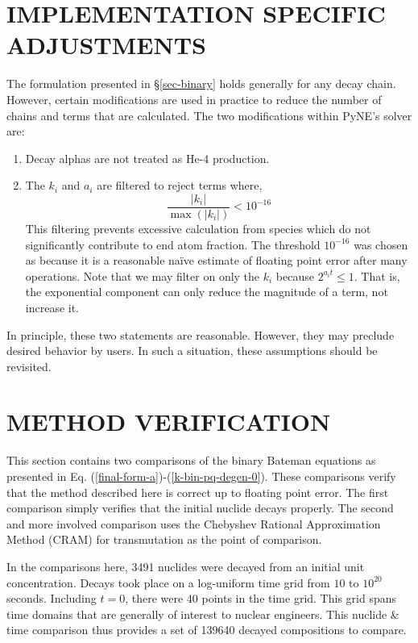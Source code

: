 \documentclass[letterpaper]{physor2018}
\begin{document}
\section{IMPLEMENTATION SPECIFIC ADJUSTMENTS}
\label{sec-impl-spec-approx}
The formulation presented in \S\ref{sec-binary} holds generally for any decay chain.
However, certain modifications are used in practice to reduce the number of chains and terms
that are calculated. The two modifications within PyNE's solver are:
\begin{enumerate}
\item Decay alphas are not treated as He-4 production.
\item The $k_i$ and $a_i$ are filtered to reject terms where,
   \begin{equation}
   \label{filter-cond}
   \frac{|k_i|}{\max(|k_i|)} < 10^{-16}
   \end{equation}
   This filtering prevents excessive
   calculation from species which do not significantly contribute to
   end atom fraction. The threshold $10^{-16}$ was chosen as
   because it is a reasonable na\"ive estimate of floating point error after
   many operations. Note that we may filter on only the $k_i$ because
   $2^{a_i t} \le 1$.  That is, the exponential component can only
   reduce the magnitude of a term, not increase it.
\end{enumerate}
In principle, these two statements are reasonable. However, they
may preclude desired behavior by users. In such a situation, these
assumptions should be revisited.


\section{METHOD VERIFICATION}
\label{sec-verify}
This section contains two comparisons of the binary Bateman equations
as presented in Eq. (\ref{final-form-a})-(\ref{k-bin-pq-degen-0}). These
comparisons verify that the method described here is correct up to
floating point error. The first comparison simply verifies that the
initial nuclide decays properly. The second and more involved comparison
uses the Chebyshev Rational Approximation Method (CRAM)
for transmutation \cite{pusa2010computing,pusa2012correction} as the point
of comparison.

In the comparisons here, 3491 nuclides were decayed from an initial unit
concentration. Decays took place on a log-uniform time grid from $10$ to $10^{20}$
seconds. Including $t=0$, there were 40 points in the time grid. This grid
spans time domains that are generally of interest to nuclear
engineers. This nuclide \& time comparison thus provides a set of 139640
decayed compositions to compare.
\end{document}
